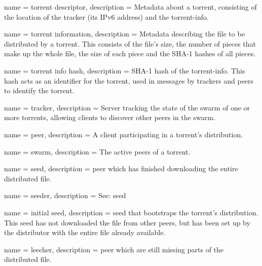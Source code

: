 {
  name        = {torrent descriptor},
  description = {Metadata about a torrent, consisting of the location of the tracker (its \gls{IPv6} address) and the \gls{torrent-info}.}
}

{
  name        = {torrent information},
  description = {Metadata describing the file to be distributed by a torrent. This consists of the file's size, the number of pieces that make up the whole file, the size of each piece and the SHA-1 hashes of all pieces. }
}

{
  name        = {torrent info hash},
  description = {SHA-1 hash of the \gls{torrent-info}. This hash acts as an identifier for the torrent, used in messages by trackers and peers to identify the torrent.}
}

{
  name        = {tracker},
  description = {Server tracking the state of the \gls{swarm} of one or more torrents, allowing clients to discover other \glspl{peer} in the swarm.}
}

{
  name        = {peer},
  description = {A client participating in a torrent's distribution.}
}

{
  name        = {swarm},
  description = {The active \glspl{peer} of a torrent.}
}

{
  name        = {seed},
  description = {\Gls{peer} which has finished downloading the entire distributed file.}
}

{
  name        = {seeder},
  description = {See: \gls{seed}}
}

{
  name        = {initial seed},
  description = {\Gls{seed} that bootstraps the torrent's distribution. This seed has not downloaded the file from other peers, but has been set up by the distributor with the entire file already available.}
}

{
  name        = {leecher},
  description = {\Gls{peer} which are still missing parts of the distributed file.}
}
